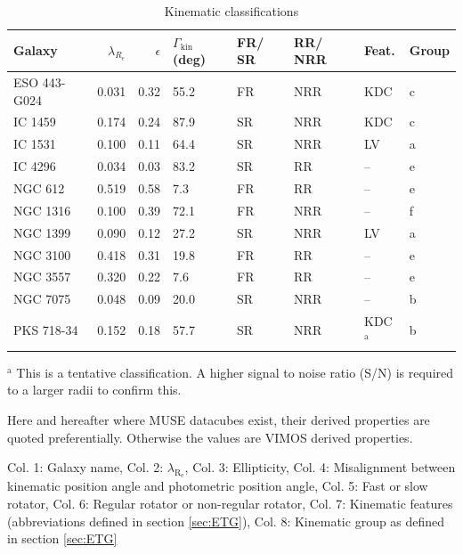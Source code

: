 		\begin{table}
			\centering
		\begin{threeparttable}
			\caption{Kinematic classifications}
			\label{tab:classify}
			\begin{tabular}{l r r p{0.7cm} l l l l}
				\hline
				\hline
				Galaxy		& $\lambda_{R_e}$ & $\epsilon$  & $\Gamma_\text{kin}$ (deg) & FR/ SR 	& RR/ NRR 	& Feat. & Group 	\\
				\hline 
				ESO 443-G024 & 0.031 & 0.32 & 55.2 	& FR & NRR & KDC & c \\
				IC 1459 	& 0.174 & 0.24 & 87.9	& SR & NRR & KDC & c \\
				IC 1531 	& 0.100 & 0.11 & 64.4 	& SR & NRR & LV & a \\
				IC 4296		& 0.034 & 0.03 & 83.2 	& SR & RR & -- & e \\
				NGC 612 	& 0.519 & 0.58 & \leavevmode\phantom{0}7.3 	& FR & RR & -- & e \\
				NGC 1316 	& 0.100 & 0.39 & 72.1 	& FR & NRR & -- & f \\
				NGC 1399 	& 0.090 & 0.12 & 27.2 	& SR & NRR & LV & a \\
				NGC 3100 	& 0.418 & 0.31 & 19.8 	& FR & RR & -- & e \\
				NGC 3557 	& 0.320 & 0.22 & \leavevmode\phantom{0}7.6 	& FR & RR & -- & e\\
				NGC 7075 	& 0.048 & 0.09 & 20.0 	& SR & NRR & -- & b \\
				PKS 718-34  & 0.152 & 0.18 & 57.7 	& SR & NRR & KDC$^\text{a}$ & b\\
				\hline
				\hline
			\end{tabular}
			\begin{tablenotes}
			\small
			\item $^\text{a}$ This is a tentative classification. A higher signal to noise ratio (S/N) is required to a larger radii to confirm this.
			\item Here and hereafter where MUSE datacubes exist, their derived properties are quoted preferentially. Otherwise the values are VIMOS derived properties. 
			\item Col. 1: Galaxy name, Col. 2: $\lambda_\mathrm{R_e}$, Col. 3: Ellipticity, Col. 4: Misalignment between kinematic position angle and photometric position angle, Col. 5: Fast or slow rotator, Col. 6: Regular rotator or non-regular rotator, Col. 7: Kinematic features (abbreviations defined in section \ref{sec:ETG}), Col. 8: Kinematic group as defined in section \ref{sec:ETG}
			\end{tablenotes}
		\end{threeparttable}
		\end{table}

